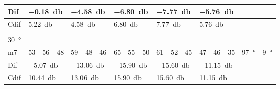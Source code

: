 \begin{table}[H]
\begin{tabular}{l|l|l|l|l|l|l|l|l|l|l|l|l|l|l|l|l|l}
Dif & \multicolumn{3}{l|}{\SI{-0.18}{\decibel}} & \multicolumn{3}{l|}{\SI{-4.58}{\decibel}} & \multicolumn{3}{l|}{\SI{-6.80}{\decibel}} & \multicolumn{3}{l|}{\SI{-7.77}{\decibel}} & \multicolumn{3}{l|}{\SI{-5.76}{\decibel}} & \multicolumn{2}{l}{}   \\ \hline 
Cdif & \multicolumn{3}{l|}{\SI{5.22}{\decibel}} & \multicolumn{3}{l|}{\SI{4.58}{\decibel}} & \multicolumn{3}{l|}{\SI{6.80}{\decibel}} & \multicolumn{3}{l|}{\SI{7.77}{\decibel}} & \multicolumn{3}{l|}{\SI{5.76}{\decibel}}  &   \multicolumn{2}{l}{}   \\ 
 \multicolumn{18}{l}{ } \\                             
\SI{30}{\degree}   & \multicolumn{3}{l|}{} & \multicolumn{3}{l|}{} & \multicolumn{3}{l|}{} & \multicolumn{3}{l|}{} &  \multicolumn{3}{l|}{}   & \multicolumn{2}{l}{}   \\  \hline
m7    & 53     & 56     & 48     &  59    & 48     &  46    & 65     & 55      &  50    &   61    & 52     &   45   & 47 & 46 & 35   & \SI{97}{\degree} & \SI{9}{\degree}  \\ \hline
Dif & \multicolumn{3}{l|}{\SI{-5.07}{\decibel}} & \multicolumn{3}{l|}{\SI{-13.06}{\decibel}} & \multicolumn{3}{l|}{\SI{-15.90}{\decibel}} & \multicolumn{3}{l|}{\SI{-15.60}{\decibel}} & \multicolumn{3}{l|}{\SI{-11.15}{\decibel}}    & \multicolumn{2}{l}{}    \\  \hline 
Cdif & \multicolumn{3}{l|}{\SI{10.44}{\decibel}} & \multicolumn{3}{l|}{\SI{13.06}{\decibel}} & \multicolumn{3}{l|}{\SI{15.90}{\decibel}} & \multicolumn{3}{l|}{\SI{15.60}{\decibel}} & \multicolumn{3}{l|}{\SI{11.15}{\decibel}}  &   \multicolumn{2}{l}{}                       
\end{tabular}
\label{meas:result_cross_8_9}
\end{table}




